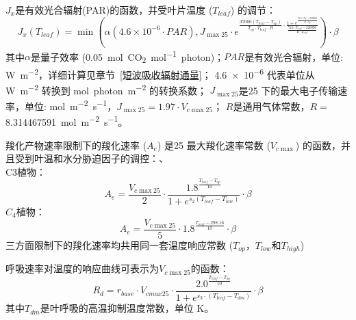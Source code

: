 $J_x$是有效光合辐射(PAR)的函数，并受叶片温度 ($T_{leaf}$) 的调节：
\begin{equation}
J_{x}\left(T_{{leaf }}\right)=\min \left(\alpha\left(4.6 \times 10^{-6} \cdot PAR\right), J_{\max 25}
 \cdot e^{\frac{37000\left(T_{{leaf }}-T_{o p}\right)}{T_{o p} \cdot T_{{leaf }} \cdot R} \cdot \frac{1+e^{\frac{710 \cdot T_{o p}-220000}
 {R \cdot T_{o p}}}}{\frac{710 \cdot T_{{leaf }}-220000}{R \cdot T_{{leaf }}}}}\right) \cdot \beta
\end{equation}
其中$\alpha$是量子效率 (\qty{0.05}{mol.CO_2.mol^{-1}.photon})；$PAR$是有效光合辐射，单位: \unit{W.m^{-2}}，详细计算见章节~\ref{短波吸收辐射通量}；
\num{4.6e-6} 代表单位从 \unit{W.m^{-2}} 转换到 \unit{mol.photon.m^{-2}} 的转换系数；
$J_{\max 25}$是25 \textcelsius 下的最大电子传输速率，单位: \unit{mol.m^{-2}.s^{-1}}，$J_{\max 25}=1.97 \cdot V_{c \max 25}$； 
$R$是通用气体常数，$R=$ \qty{8.314467591}{mol.m^{-2}.s^{-1}}。

羧化产物速率限制下的羧化速率 ($A_e$) 是25 \textcelsius 最大羧化速率常数 ($V_{c \max}$) 的函数，并且受到叶温和水分胁迫因子的调控：、\\
C3植物：\\
\begin{equation}\label{A_e_a}
A_e=\frac{V_{c \max 25}}{2} \cdot \frac{1.8^{\frac{T_{{leaf }}-T_{o p}}{10}}}{1+e^{s_{2}\left(T_{{leaf }}-T_{{low }}\right)}} \cdot \beta
\end{equation}
$C_4$植物：\\
\begin{equation}\label{A_e_b}
A_e=\frac{V_{c \max 25}}{5} \cdot 1.8^{\frac{T_{{leaf }}-298.16}{10}} \cdot \beta
\end{equation}
三方面限制下的羧化速率均共用同一套温度响应常数 ($T_{op}$，$T_{low}$和$T_{high}$)


呼吸速率对温度的响应曲线可表示为$V_{c \max25}$的函数：
\begin{equation}\label{R_d1}
R_{d}=r_{{base }} \cdot V_{cmax 25} \cdot \frac{2.0^{\frac{T_{leaf}-T_{op}}{10}}}{1+e^{s_3 \cdot\left(T_{leaf}-T_{d m}\right)}} \cdot \beta
\end{equation}
其中$T_{dm}$是叶呼吸的高温抑制温度常数，单位 K。



